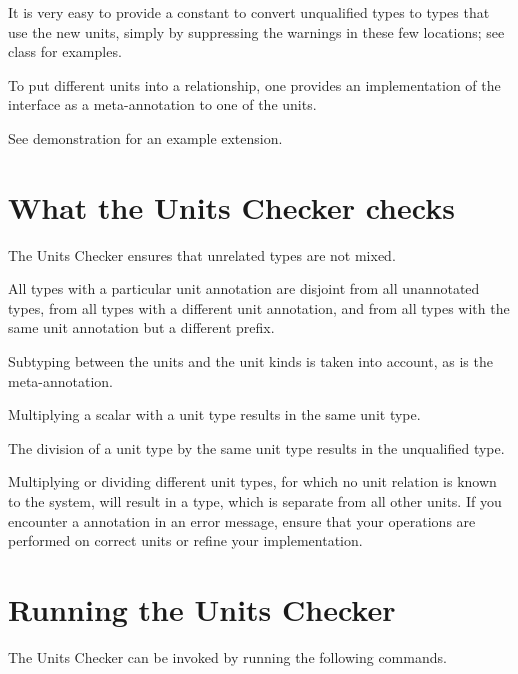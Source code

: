 It is very easy to provide a constant to convert
unqualified types to types that use the new units,
simply by suppressing the warnings in these few locations;
see class  for examples.

To put different units into a relationship, one provides an
implementation of the  interface as a
meta-annotation to one of the units.

See demonstration  for an example
extension.



\section{What the Units Checker checks\label{units-checks}}

The Units Checker ensures that unrelated types are not mixed. 

All types with a particular unit annotation are
disjoint from all unannotated types, from all types with a different unit
annotation, and from all types with the same unit annotation but a
different prefix.

Subtyping between the units and the unit kinds is taken into account,
as is the  meta-annotation.

Multiplying a scalar with a unit type results in the same unit type.

The division of a unit type by the same unit type
results in the unqualified type.

Multiplying or dividing different unit types, for which no unit
relation is known to the system, will result in a 
type, which is separate from all other units.
If you encounter a  annotation in an error message,
ensure that your operations are performed on correct units or refine
your  implementation.



\section{Running the Units Checker\label{units-running}}

The Units Checker can be invoked by running the following commands.


